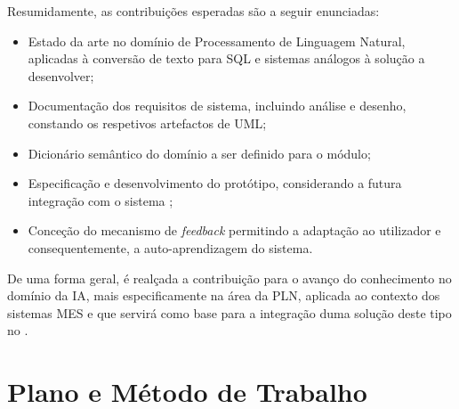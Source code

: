 Resumidamente, as contribuições esperadas são a seguir enunciadas:

\begin{itemize}
    \item
    {
        Estado da arte no domínio de Processamento de Linguagem Natural, aplicadas à conversão de texto para \gls{SQL} e sistemas análogos à solução a desenvolver;
    }
    \item 
    {
        Documentação dos requisitos de sistema, incluindo análise e desenho, constando os respetivos artefactos de \gls{UML};
    }
    \item 
    {
        Dicionário semântico do domínio a ser definido para o módulo;
    }
    \item
    {
        Especificação e desenvolvimento do protótipo, considerando a futura integração com o sistema {\productname};
    }
    \item
    {
        Conceção do mecanismo de \textit{feedback} permitindo a adaptação ao utilizador e consequentemente, a auto-aprendizagem do sistema.
    }
\end{itemize}

De uma forma geral, é realçada a contribuição para o avanço do conhecimento no domínio da \gls{IA}, mais especificamente na área da \gls{PLN}, aplicada ao contexto dos sistemas \gls{MES} e que servirá como base para a integração duma solução deste tipo no {\productname}.







\chapter{Plano e Método de Trabalho}
\label{chap:pre7}

